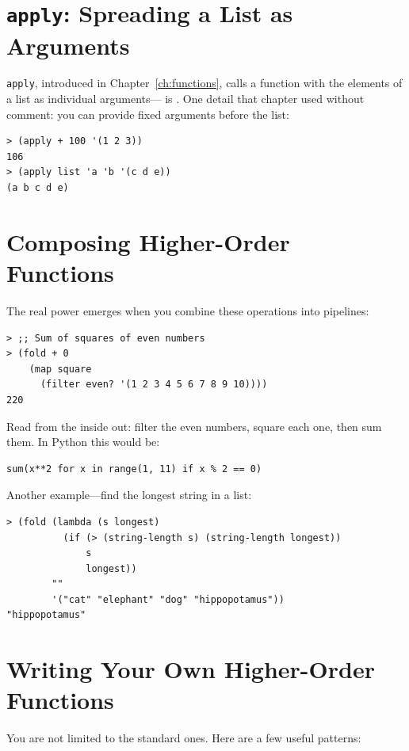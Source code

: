 \section{\texttt{apply}: Spreading a List as Arguments}

\texttt{apply}, introduced in Chapter~\ref{ch:functions}, calls a function with the elements of a list as individual arguments--- is . One detail that chapter used without comment: you can provide fixed arguments before the list:

\begin{lstlisting}[style=repl]
> (apply + 100 '(1 2 3))
106
> (apply list 'a 'b '(c d e))
(a b c d e)
\end{lstlisting}

\section{Composing Higher-Order Functions}

The real power emerges when you combine these operations into pipelines:

\begin{lstlisting}[style=repl]
> ;; Sum of squares of even numbers
> (fold + 0
    (map square
      (filter even? '(1 2 3 4 5 6 7 8 9 10))))
220
\end{lstlisting}

Read from the inside out: filter the even numbers, square each one, then sum them. In Python this would be:

\begin{Verbatim}[fontsize=\small]
sum(x**2 for x in range(1, 11) if x % 2 == 0)
\end{Verbatim}

Another example---find the longest string in a list:

\begin{lstlisting}[style=repl]
> (fold (lambda (s longest)
          (if (> (string-length s) (string-length longest))
              s
              longest))
        ""
        '("cat" "elephant" "dog" "hippopotamus"))
"hippopotamus"
\end{lstlisting}

\section{Writing Your Own Higher-Order Functions}

You are not limited to the standard ones. Here are a few useful patterns:


